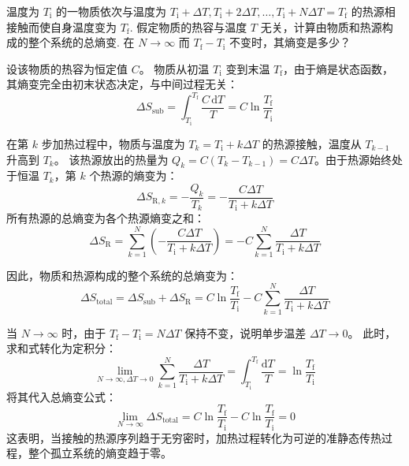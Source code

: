 \begin{exercise}\label{ex:12.3}
温度为 $T_{\mathrm{i}}$ 的一物质依次与温度为 $T_{\mathrm{i}} + \Delta T, T_{\mathrm{i}} + 2\Delta T, \dots, T_{\mathrm{i}} + N\Delta T = T_{\mathrm{f}}$ 的热源相接触而使自身温度变为 $T_{\mathrm{f}}$. 假定物质的热容与温度 $T$ 无关，计算由物质和热源构成的整个系统的总熵变. 在 $N \to \infty$ 而 $T_{\mathrm{f}} - T_{\mathrm{i}}$ 不变时，其熵变是多少？
\end{exercise}
\begin{solution}
设该物质的热容为恒定值 $C$。
物质从初温 $T_{\mathrm{i}}$ 变到末温 $T_{\mathrm{f}}$，由于熵是状态函数，其熵变完全由初末状态决定，与中间过程无关：
$$ \Delta S_{\mathrm{sub}} = \int_{T_{\mathrm{i}}}^{T_{\mathrm{f}}} \frac{C \, \mathrm{d}T}{T} = C \ln\frac{T_{\mathrm{f}}}{T_{\mathrm{i}}} $$

在第 $k$ 步加热过程中，物质与温度为 $T_k = T_{\mathrm{i}} + k\Delta T$ 的热源接触，温度从 $T_{k-1}$ 升高到 $T_k$。
该热源放出的热量为 $Q_k = C(T_k - T_{k-1}) = C \Delta T$。由于热源始终处于恒温 $T_k$，第 $k$ 个热源的熵变为：
$$ \Delta S_{\mathrm{R},k} = -\frac{Q_k}{T_k} = -\frac{C \Delta T}{T_{\mathrm{i}} + k\Delta T} $$
所有热源的总熵变为各个热源熵变之和：
$$ \Delta S_{\mathrm{R}} = \sum_{k=1}^N \left( -\frac{C \Delta T}{T_{\mathrm{i}} + k\Delta T} \right) = -C \sum_{k=1}^N \frac{\Delta T}{T_{\mathrm{i}} + k\Delta T} $$

因此，物质和热源构成的整个系统的总熵变为：
$$ \Delta S_{\mathrm{total}} = \Delta S_{\mathrm{sub}} + \Delta S_{\mathrm{R}} = C \ln\frac{T_{\mathrm{f}}}{T_{\mathrm{i}}} - C \sum_{k=1}^N \frac{\Delta T}{T_{\mathrm{i}} + k\Delta T} $$

当 $N \to \infty$ 时，由于 $T_{\mathrm{f}} - T_{\mathrm{i}} = N\Delta T$ 保持不变，说明单步温差 $\Delta T \to 0$。
此时，求和式转化为定积分：
$$ \lim_{N \to \infty, \Delta T \to 0} \sum_{k=1}^N \frac{\Delta T}{T_{\mathrm{i}} + k\Delta T} = \int_{T_{\mathrm{i}}}^{T_{\mathrm{f}}} \frac{\mathrm{d}T}{T} = \ln\frac{T_{\mathrm{f}}}{T_{\mathrm{i}}} $$
将其代入总熵变公式：
$$ \lim_{N \to \infty} \Delta S_{\mathrm{total}} = C \ln\frac{T_{\mathrm{f}}}{T_{\mathrm{i}}} - C \ln\frac{T_{\mathrm{f}}}{T_{\mathrm{i}}} = 0 $$
这表明，当接触的热源序列趋于无穷密时，加热过程转化为可逆的准静态传热过程，整个孤立系统的熵变趋于零。
\end{solution}

